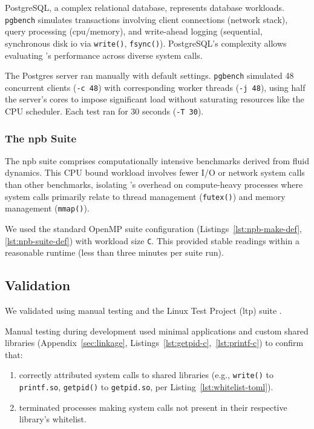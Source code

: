 PostgreSQL, a complex relational database, represents database workloads. 
\texttt{pgbench} simulates transactions involving client connections 
(network stack), query processing (\ac{cpu}/memory), and write-ahead
logging (sequential, synchronous disk \ac{io} via \texttt{write()}, 
\texttt{fsync()}). PostgreSQL's complexity allows evaluating \af's 
performance across diverse system calls.

The Postgres server ran manually with default settings. \texttt{pgbench} simulated
48 concurrent clients (\texttt{-c 48}) with corresponding worker threads 
(\texttt{-j 48}), using half the server's cores to impose significant load
without saturating resources like the CPU scheduler. Each test ran for 30
seconds (\texttt{-T 30}). 

\subsubsection{The \ac{npb} Suite}\label{subsubsec:npb-just}

The \acl{npb} suite comprises computationally intensive benchmarks derived
from fluid dynamics. This CPU bound workload involves fewer I/O or network
system calls than other benchmarks, isolating \af's overhead on compute-heavy
processes where system calls primarily relate to thread management 
(\texttt{futex()}) and memory management (\texttt{mmap()}). 

We used the standard OpenMP suite configuration (Listings~\ref{lst:npb-make-def},
\ref{lst:npb-suite-def}) with workload size \texttt{C}. This provided
stable readings within a reasonable runtime (less than three minutes per suite run).

\subsection{Validation}\label{subsec:validation}

We validated \af using manual testing and the Linux Test Project (\ac{ltp})
suite \cite{LINUX_TEST_PROJECT}. 

Manual testing during development used minimal applications and custom
shared libraries (Appendix~\ref{sec:linkage}, 
Listings~\ref{lst:getpid-c},~\ref{lst:printf-c}) to confirm that: 

\begin{enumerate}
    \item \af correctly attributed system calls to shared libraries
        (e.g., \texttt{write()} to \texttt{printf.so}, \texttt{getpid()} to 
        \texttt{getpid.so}, per Listing~\ref{lst:whitelist-toml}).
    \item \af terminated processes making system calls not present in their
        respective library's whitelist.
\end{enumerate}

